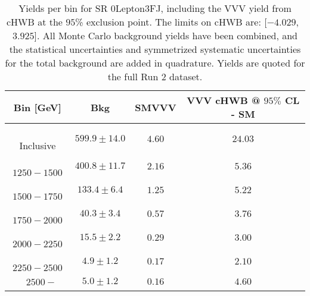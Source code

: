 \begin{table}[!htbp]
    \small
    \center
    \begin{tabular}{c||c|c|c}
    Bin [GeV] & Bkg & SMVVV & \pbox{20cm}{VVV \\ cHWB @ $95\%$ CL - SM \\ }\\
    \hline
    \pbox{20cm}{ ~ \\Inclusive\\ } & $599.9 \pm 14.0$ & $4.60$ & $24.03$\\
    \hline
    \pbox{20cm}{ ~ \\$1250-1500$\\ } & $400.8 \pm 11.7$ & $2.16$ & $5.36$\\
    \hline
    \pbox{20cm}{ ~ \\$1500-1750$\\ } & $133.4 \pm 6.4$ & $1.25$ & $5.22$\\
    \hline
    \pbox{20cm}{ ~ \\$1750-2000$\\ } & $40.3 \pm 3.4$ & $0.57$ & $3.76$\\
    \hline
    \pbox{20cm}{ ~ \\$2000-2250$\\ } & $15.5 \pm 2.2$ & $0.29$ & $3.00$\\
    \hline
    \pbox{20cm}{ ~ \\$2250-2500$\\ } & $4.9 \pm 1.2$ & $0.17$ & $2.10$\\
    \hline
    \pbox{20cm}{ ~ \\$2500-$\\ } & $5.0 \pm 1.2$ & $0.16$ & $4.60$\\
\end{tabular}
    \caption{Yields per bin for SR 0Lepton3FJ, including the VVV yield from cHWB at the $95$\% exclusion point. The limits on cHWB are: [$-4.029$,~$3.925$]. All Monte Carlo background yields have been combined, and the statistical uncertainties and symmetrized systematic uncertainties for the total background are added in quadrature. Yields are quoted for the full Run 2 dataset.}
    \label{tab:0Lepton3FJ$binssignal}
\end{table}
